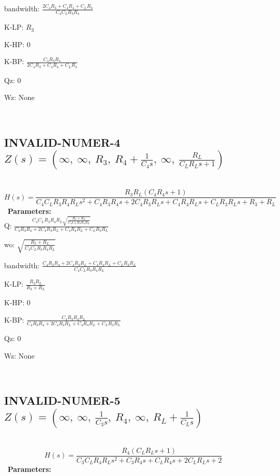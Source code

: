 \documentclass{article}
\begin{document}
bandwidth: $\frac{2 C_{4} R_{3} + C_{4} R_{4} + C_{L} R_{3}}{C_{4} C_{L} R_{3} R_{4}}$\ 

K-LP: $R_{3}$\ 

K-HP: $0$\ 

K-BP: $\frac{C_{4} R_{3} R_{4}}{2 C_{4} R_{3} + C_{4} R_{4} + C_{L} R_{3}}$\ 

Qz: $0$\ 

Wz: $\text{None}$\ 

\ 

\subsection{INVALID-NUMER-4 $Z(s) = \left( \infty, \  \infty, \  R_{3}, \  R_{4} + \frac{1}{C_{4} s}, \  \infty, \  \frac{R_{L}}{C_{L} R_{L} s + 1}\right)$ } \ 
\textbf{\[H(s) = \frac{R_{3} R_{L} \left(C_{4} R_{4} s + 1\right)}{C_{4} C_{L} R_{3} R_{4} R_{L} s^{2} + C_{4} R_{3} R_{4} s + 2 C_{4} R_{3} R_{L} s + C_{4} R_{4} R_{L} s + C_{L} R_{3} R_{L} s + R_{3} + R_{L}}\] } \ 
\textbf{Parameters:}\\ 

Q: $\frac{C_{4} C_{L} R_{3} R_{4} R_{L} \sqrt{\frac{R_{3} + R_{L}}{C_{4} C_{L} R_{3} R_{4} R_{L}}}}{C_{4} R_{3} R_{4} + 2 C_{4} R_{3} R_{L} + C_{4} R_{4} R_{L} + C_{L} R_{3} R_{L}}$\ 

wo: $\sqrt{\frac{R_{3} + R_{L}}{C_{4} C_{L} R_{3} R_{4} R_{L}}}$\ 

bandwidth: $\frac{C_{4} R_{3} R_{4} + 2 C_{4} R_{3} R_{L} + C_{4} R_{4} R_{L} + C_{L} R_{3} R_{L}}{C_{4} C_{L} R_{3} R_{4} R_{L}}$\ 

K-LP: $\frac{R_{3} R_{L}}{R_{3} + R_{L}}$\ 

K-HP: $0$\ 

K-BP: $\frac{C_{4} R_{3} R_{4} R_{L}}{C_{4} R_{3} R_{4} + 2 C_{4} R_{3} R_{L} + C_{4} R_{4} R_{L} + C_{L} R_{3} R_{L}}$\ 

Qz: $0$\ 

Wz: $\text{None}$\ 

\ 

\subsection{INVALID-NUMER-5 $Z(s) = \left( \infty, \  \infty, \  \frac{1}{C_{3} s}, \  R_{4}, \  \infty, \  R_{L} + \frac{1}{C_{L} s}\right)$ } \ 
\textbf{\[H(s) = \frac{R_{4} \left(C_{L} R_{L} s + 1\right)}{C_{3} C_{L} R_{4} R_{L} s^{2} + C_{3} R_{4} s + C_{L} R_{4} s + 2 C_{L} R_{L} s + 2}\] } \ 
\textbf{Parameters:}\\ 
\end{document}

